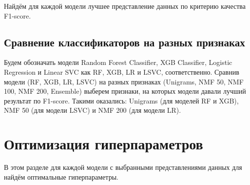 \documentclass[12pt, twoside]{article}
\begin{document}
Найдём для каждой модели лучшее представление данных по критерию качества F1-score.

\subsection{Сравнение классификаторов на разных признаках}

Будем обозначать модели Random Forest Classifier, XGB Classifier, Logistic Regression и Linear SVC как RF, XGB, LR и LSVC, соответственно. Сравнив модели (RF, XGB, LR, LSVC) на разных признаках (Unigrams, NMF 50, NMF 100, NMF 200, Ensemble) выберем признаки, на которых модели давали лучший результат по F1-score. Такими оказались: Unigrams (для моделей RF и XGB), NMF 50 (для модели LSVC) и NMF 200 (для модели LR).

\section{Оптимизация гиперпараметров}

В этом разделе для каждой модели с выбранными представлениями данных для найдём оптимальные гиперпараметры.

\newpage
\end{document}
